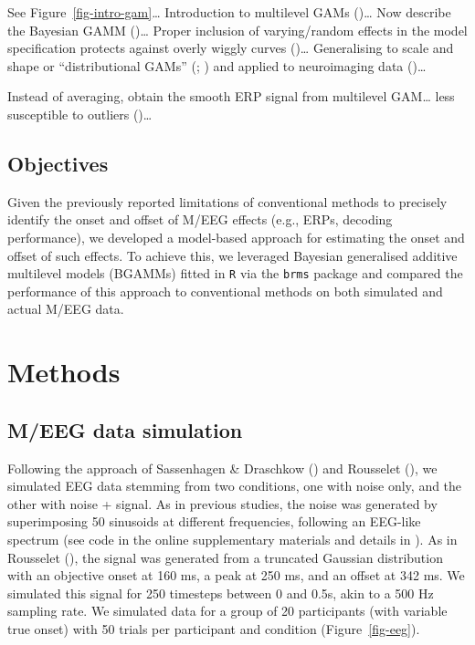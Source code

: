 \documentclass[
  doc,
  floatsintext,
  longtable,
  a4paper,
  nolmodern,
  notxfonts,
  notimes,
  donotrepeattitle,
  colorlinks=true,linkcolor=blue,citecolor=blue,urlcolor=blue]{apa7}
\begin{document}
See Figure~\ref{fig-intro-gam}\ldots{} Introduction to multilevel GAMs
()\ldots{} Now describe the Bayesian GAMM
()\ldots{} Proper inclusion of
varying/random effects in the model specification protects against
overly wiggly curves ()\ldots{} Generalising to scale and shape or ``distributional
GAMs'' (;
) and applied to
neuroimaging data ()\ldots{}

Instead of averaging, obtain the smooth ERP signal from multilevel
GAM\ldots{} less susceptible to outliers
()\ldots{}

\subsection{Objectives}\label{objectives}

Given the previously reported limitations of conventional methods to
precisely identify the onset and offset of M/EEG effects (e.g., ERPs,
decoding performance), we developed a model-based approach for
estimating the onset and offset of such effects. To achieve this, we
leveraged Bayesian generalised additive multilevel models (BGAMMs)
fitted in \texttt{R} via the \texttt{brms} package and compared the
performance of this approach to conventional methods on both simulated
and actual M/EEG data.

\section{Methods}\label{methods}

\subsection{M/EEG data simulation}\label{meeg-data-simulation}

Following the approach of Sassenhagen \& Draschkow
() and Rousselet
(), we simulated EEG data
stemming from two conditions, one with noise only, and the other with
noise + signal. As in previous studies, the noise was generated by
superimposing 50 sinusoids at different frequencies, following an
EEG-like spectrum (see code in the online supplementary materials and
details in ). As in
Rousselet (), the signal was
generated from a truncated Gaussian distribution with an objective onset
at 160 ms, a peak at 250 ms, and an offset at 342 ms. We simulated this
signal for 250 timesteps between 0 and 0.5s, akin to a 500 Hz sampling
rate. We simulated data for a group of 20 participants (with variable
true onset) with 50 trials per participant and condition
(Figure~\ref{fig-eeg}).
\end{document}
